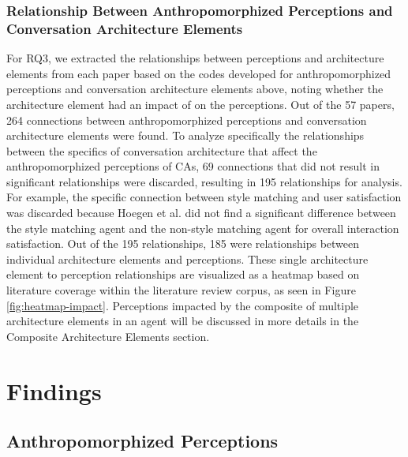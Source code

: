 \documentclass[sigconf,screen,review, anonymous]{acmart}
\newcommand{\cmt}[1]{}%
\begin{document}
\subsubsection*{Relationship Between Anthropomorphized Perceptions and Conversation Architecture Elements}
For RQ3, we extracted the relationships between perceptions and architecture elements from each paper based on the codes developed for anthropomorphized perceptions and conversation architecture elements above, noting whether the architecture element had an impact of on the perceptions. Out of the 57 papers, 264 connections between anthropomorphized perceptions and conversation architecture elements were found. To analyze specifically the relationships between the specifics of conversation architecture that affect the anthropomorphized perceptions of CAs, 69 connections that did not result in significant relationships were discarded, resulting in 195 relationships for analysis. For example, the specific connection between style matching and user satisfaction was discarded because Hoegen et al. \cite{hoegen2019end}\cmt{[31]} did not find a significant difference between the style matching agent and the non-style matching agent for overall interaction satisfaction. Out of the 195 relationships, 185 were relationships between individual architecture elements and perceptions. These single architecture element to perception relationships are visualized as a heatmap based on literature coverage within the literature review corpus, as seen in Figure \ref{fig:heatmap-impact}. Perceptions impacted by the composite of multiple architecture elements in an agent will be discussed in more details in the Composite Architecture Elements section.

\section{Findings}

\subsection{Anthropomorphized Perceptions}
\end{document}
